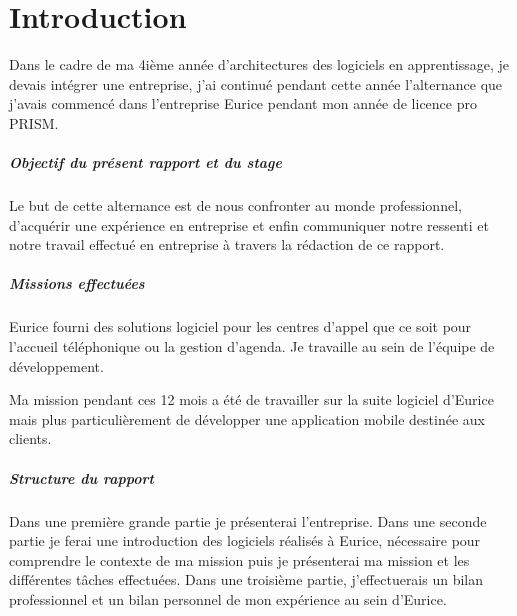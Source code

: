 \chapter{Introduction}

Dans le cadre de ma 4ième année d'architectures des logiciels en apprentissage, 
je devais intégrer une entreprise, j'ai continué pendant cette année l'alternance que j'avais commencé 
dans l'entreprise Eurice pendant mon année de licence pro PRISM.\newline

\paragraph{Objectif du présent rapport et du stage}
Le but de cette alternance est de nous confronter au monde professionnel, 
d’acquérir une expérience en entreprise et enfin communiquer notre ressenti et 
notre travail effectué en entreprise à travers la rédaction de ce rapport. \newline

\paragraph{Missions effectuées}
Eurice fourni des solutions logiciel pour les centres d'appel 
que ce soit pour l'accueil téléphonique ou la gestion d'agenda. 
Je travaille au sein de l’équipe de développement. 

Ma mission pendant ces 12 mois a été de travailler sur la suite logiciel d'Eurice 
mais plus particulièrement de développer une application mobile destinée aux clients. \newline

\paragraph{Structure du rapport}
Dans une première grande partie je présenterai l’entreprise. 
Dans une seconde partie je ferai une introduction des logiciels réalisés à Eurice, nécessaire pour comprendre le contexte de ma mission 
puis je présenterai ma mission et les différentes tâches effectuées.
Dans une troisième partie, j'effectuerais un bilan professionnel et un bilan personnel de mon expérience au sein d'Eurice. \newline
\newpage 



